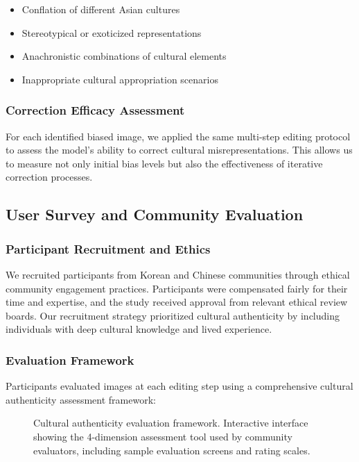 \documentclass{article}
\begin{document}
\begin{itemize}
\item Conflation of different Asian cultures
\item Stereotypical or exoticized representations
\item Anachronistic combinations of cultural elements
\item Inappropriate cultural appropriation scenarios
\end{itemize}

\subsubsection{Correction Efficacy Assessment}
For each identified biased image, we applied the same multi-step editing protocol to assess the model's ability to correct cultural misrepresentations. This allows us to measure not only initial bias levels but also the effectiveness of iterative correction processes.

\subsection{User Survey and Community Evaluation}

\subsubsection{Participant Recruitment and Ethics}
We recruited participants from Korean and Chinese communities through ethical community engagement practices. Participants were compensated fairly for their time and expertise, and the study received approval from relevant ethical review boards. Our recruitment strategy prioritized cultural authenticity by including individuals with deep cultural knowledge and lived experience.

\subsubsection{Evaluation Framework}
Participants evaluated images at each editing step using a comprehensive cultural authenticity assessment framework:

\begin{figure}[h]
  \centering
  \fbox{\rule[-.5cm]{0cm}{4cm} \rule[-.5cm]{12cm}{0cm}}
  \caption{Cultural authenticity evaluation framework. Interactive interface showing the 4-dimension assessment tool used by community evaluators, including sample evaluation screens and rating scales.}
  \label{fig:evaluation-framework}
\end{figure}
\end{document}
